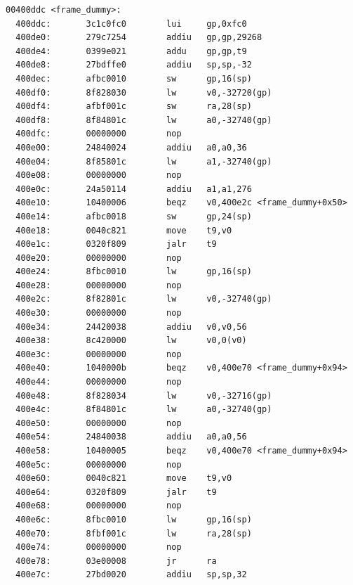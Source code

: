 \documentclass[11pt]{article}
\begin{document}
\begin{verbatim}
00400ddc <frame_dummy>:
  400ddc:       3c1c0fc0        lui     gp,0xfc0
  400de0:       279c7254        addiu   gp,gp,29268
  400de4:       0399e021        addu    gp,gp,t9
  400de8:       27bdffe0        addiu   sp,sp,-32
  400dec:       afbc0010        sw      gp,16(sp)
  400df0:       8f828030        lw      v0,-32720(gp)
  400df4:       afbf001c        sw      ra,28(sp)
  400df8:       8f84801c        lw      a0,-32740(gp)
  400dfc:       00000000        nop
  400e00:       24840024        addiu   a0,a0,36
  400e04:       8f85801c        lw      a1,-32740(gp)
  400e08:       00000000        nop
  400e0c:       24a50114        addiu   a1,a1,276
  400e10:       10400006        beqz    v0,400e2c <frame_dummy+0x50>
  400e14:       afbc0018        sw      gp,24(sp)
  400e18:       0040c821        move    t9,v0
  400e1c:       0320f809        jalr    t9
  400e20:       00000000        nop
  400e24:       8fbc0010        lw      gp,16(sp)
  400e28:       00000000        nop
  400e2c:       8f82801c        lw      v0,-32740(gp)
  400e30:       00000000        nop
  400e34:       24420038        addiu   v0,v0,56
  400e38:       8c420000        lw      v0,0(v0)
  400e3c:       00000000        nop
  400e40:       1040000b        beqz    v0,400e70 <frame_dummy+0x94>
  400e44:       00000000        nop
  400e48:       8f828034        lw      v0,-32716(gp)
  400e4c:       8f84801c        lw      a0,-32740(gp)
  400e50:       00000000        nop
  400e54:       24840038        addiu   a0,a0,56
  400e58:       10400005        beqz    v0,400e70 <frame_dummy+0x94>
  400e5c:       00000000        nop
  400e60:       0040c821        move    t9,v0
  400e64:       0320f809        jalr    t9
  400e68:       00000000        nop
  400e6c:       8fbc0010        lw      gp,16(sp)
  400e70:       8fbf001c        lw      ra,28(sp)
  400e74:       00000000        nop
  400e78:       03e00008        jr      ra
  400e7c:       27bd0020        addiu   sp,sp,32


\end{verbatim}
\end{document}
